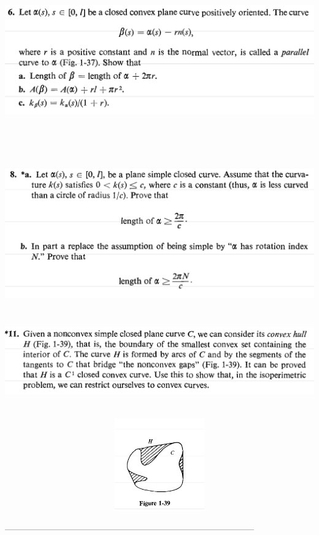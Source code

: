 \documentclass{report}
\begin{document}
\begin{question}{}{}
\includegraphics[height=8cm,width=18cm]{hw2q13}
\end{question}


\begin{question}{}{}
\includegraphics[height=6cm,width=18cm]{hw2q12}
\end{question}
\begin{question}{}{}
\includegraphics[height=4cm,width=18cm]{hw2q11}

\includegraphics[height=4cm,width=18cm]{hw2q10}
\end{question}
---------------------------------------------------------------------------------------
\end{document}
